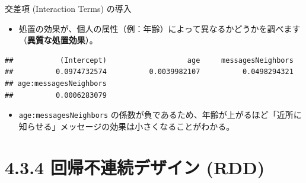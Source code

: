 \documentclass[
  ignorenonframetext,
]{beamer}
\newenvironment{Shaded}{\begin{snugshade}}{\end{snugshade}}
\newcommand{\AttributeTok}[1]{\textcolor[rgb]{0.77,0.63,0.00}{#1}}
\newcommand{\CommentTok}[1]{\textcolor[rgb]{0.56,0.35,0.01}{\textit{#1}}}
\newcommand{\DecValTok}[1]{\textcolor[rgb]{0.00,0.00,0.81}{#1}}
\newcommand{\FunctionTok}[1]{\textcolor[rgb]{0.00,0.00,0.00}{#1}}
\newcommand{\NormalTok}[1]{#1}
\newcommand{\OtherTok}[1]{\textcolor[rgb]{0.56,0.35,0.01}{#1}}
\newcommand{\SpecialCharTok}[1]{\textcolor[rgb]{0.00,0.00,0.00}{#1}}
\newcommand{\StringTok}[1]{\textcolor[rgb]{0.31,0.60,0.02}{#1}}
\providecommand{\tightlist}{%
  \setlength{\itemsep}{0pt}\setlength{\parskip}{0pt}}
\begin{document}
\begin{frame}[fragile]{交差項 (Interaction Terms) の導入}
\protect\hypertarget{ux4ea4ux5deeux9805-interaction-terms-ux306eux5c0eux5165}{}
\begin{itemize}
\tightlist
\item
  処置の効果が、個人の属性（例：年齢）によって異なるかどうかを調べます（\textbf{異質な処置効果}）。
\end{itemize}

\scriptsize

\begin{Shaded}
\end{Shaded}

\begin{verbatim}
##           (Intercept)                   age     messagesNeighbors 
##          0.0974732574          0.0039982107          0.0498294321 
## age:messagesNeighbors 
##          0.0006283079
\end{verbatim}

\normalsize

\begin{itemize}
\tightlist
\item
  \texttt{age:messagesNeighbors}
  の係数が負であるため、年齢が上がるほど「近所に知らせる」メッセージの効果は小さくなることがわかる。
\end{itemize}
\end{frame}

\hypertarget{ux56deux5e30ux4e0dux9023ux7d9aux30c7ux30b6ux30a4ux30f3-rdd}{%
\section{4.3.4 回帰不連続デザイン
(RDD)}\label{ux56deux5e30ux4e0dux9023ux7d9aux30c7ux30b6ux30a4ux30f3-rdd}}
\end{document}
